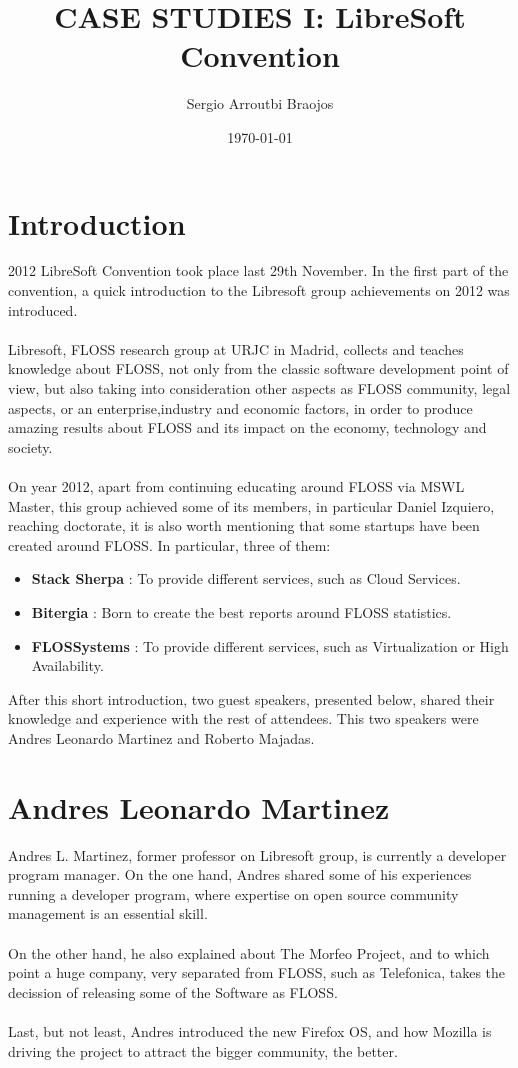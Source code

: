 \documentclass[11pt]{article}
\title{\textbf{CASE STUDIES I: LibreSoft Convention}}
\author{Sergio Arroutbi Braojos}
\date{\today}
\begin{document}
\maketitle

\section{Introduction}
  2012 LibreSoft Convention took place last 29th November. In the first part of the convention, a quick introduction to the Libresoft group achievements on 2012 was introduced.\\
\\
  Libresoft, FLOSS research group at URJC in Madrid, collects and teaches knowledge about FLOSS, not only from the classic software development point of view, but also taking into consideration other aspects as FLOSS community, legal aspects, or an enterprise,industry and economic factors, in order to produce amazing results about FLOSS and its impact on the economy, technology and society.\\
  \\
  On year 2012, apart from continuing educating around FLOSS via MSWL Master, this group achieved some of its members, in particular Daniel Izquiero, reaching doctorate, it is also worth mentioning that some startups have been created around FLOSS. In particular, three of them:
\begin{itemize}
  \item{\textbf{Stack Sherpa}} : To provide different services, such as Cloud Services.
  \item{\textbf{Bitergia}} : Born to create the best reports around FLOSS statistics.
  \item{\textbf{FLOSSystems}} : To provide different services, such as Virtualization or High Availability.
\end{itemize}
After this short introduction, two guest speakers, presented below, shared their knowledge and experience with the rest of attendees. This two speakers were Andres Leonardo Martinez and Roberto Majadas.
  
\section{Andres Leonardo Martinez}
  Andres L. Martinez, former professor on Libresoft group, is currently a developer program manager.
  On the one hand, Andres shared some of his experiences running a developer program, where  expertise on open source community management is an essential skill.\\
\\
  On the other hand, he also explained about The Morfeo Project, and to which point a huge company, very separated from FLOSS, such as Telefonica, takes the decission of releasing some of the Software as FLOSS.\\
\\
  Last, but not least, Andres introduced the new Firefox OS, and how Mozilla is driving the project to attract the bigger community, the better.
\end{document}
